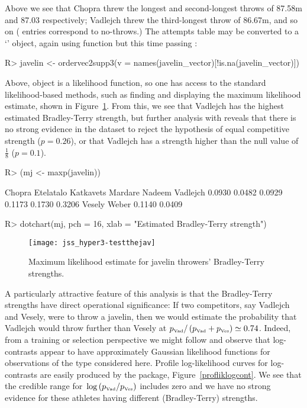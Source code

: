 \documentclass[article]{jss}
\begin{document}
%
Above we see that Chopra threw the longest and second-longest throws
of 87.58m and 87.03 respectively; Vadlejch threw the third-longest
throw of 86.67m, and so on ( entries correspond to
no-throws.)  The attempts table may be converted to a `'
object, again using function  but this
time passing :
%
\begin{Schunk}
\begin{Sinput}
R> javelin <- ordervec2supp3(v = names(javelin_vector)[!is.na(javelin_vector)])
\end{Sinput}
\end{Schunk}
%
Above, object  is a  likelihood function,
so one has access to the standard likelihood-based methods, such as
finding and displaying the maximum likelihood estimate, shown in
Figure~\ref{javelinbradleyterry}.  From this, we see that Vadlejch has
the highest estimated Bradley-Terry strength, but further analysis
with  reveals that there is no strong evidence in
the dataset to reject the hypothesis of equal competitive strength
($p=0.26$), or that Vadlejch has a strength higher than the null value
of $\frac{1}{8}$ ($p=0.1$).
%
\begin{Schunk}
\begin{Sinput}
R> (mj <- maxp(javelin))
\end{Sinput}
\begin{Soutput}
   Chopra Etelatalo Katkavets   Mardare    Nadeem  Vadlejch 
   0.0930    0.0482    0.0929    0.1173    0.1730    0.3206 
   Vesely     Weber 
   0.1140    0.0409 
\end{Soutput}
\begin{Sinput}
R> dotchart(mj, pch = 16, xlab = "Estimated Bradley-Terry strength")
\end{Sinput}
\end{Schunk}
%
\begin{figure}[t!]
\centering
\texttt{[image: jss\_hyper3-testthejav]}
\caption{Maximum \label{javelinbradleyterry} likelihood estimate for javelin throwers' Bradley-Terry strengths.}
\end{figure}

A particularly attractive feature of this analysis is that the
Bradley-Terry strengths have direct operational significance: If two
competitors, say Vadlejch and Vesely, were to throw a javelin, then we
would estimate the probability that Vadlejch would throw further than
Vesely at $\displaystyle p_{\mbox{\tiny Vad}}/\left(p_{\mbox{\tiny
Vad}} + p_{\mbox{\tiny Ves}}\right)\simeq 0.74$.  Indeed, from a
training or selection perspective we might follow \cite{hankin2017}
and observe that log-contrasts \citep{ohagan2004} appear to have
approximately Gaussian likelihood functions for observations of the
type considered here.  Profile log-likelihood curves for log-contrasts
are easily produced by the package, Figure~\ref{profliklogcont}.  We
see that the credible range for~$\log\left(p_{\mbox{\tiny Vad}}/
p_{\mbox{\tiny Ves}}\right)$ includes zero and we have no strong
evidence for these athletes having different (Bradley-Terry)
strengths.
\end{document}
